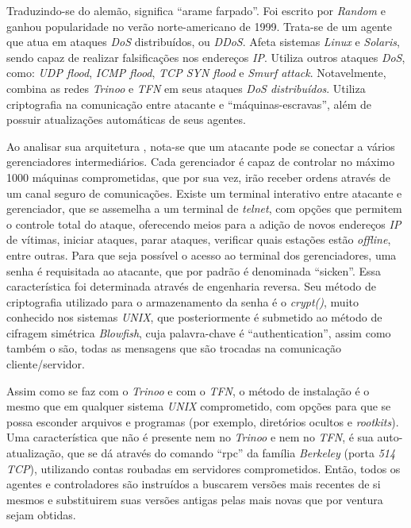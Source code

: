 Traduzindo-se do alemão, significa ``arame farpado''. Foi escrito por \textit{Random} e ganhou popularidade no verão norte-americano de 1999. Trata-se de um agente que atua em ataques \textit{DoS} distribuídos, ou \textit{DDoS}. Afeta sistemas \textit{Linux} e \textit{Solaris}, sendo capaz de realizar falsificações nos endereços \textit{IP}. Utiliza outros ataques \textit{DoS}, como: \textit{UDP flood}, \textit{ICMP flood}, \textit{TCP SYN flood} e \textit{Smurf attack}. Notavelmente, combina as redes \textit{Trinoo} e \textit{TFN} em seus ataques \textit{DoS distribuídos}. Utiliza criptografia na comunicação entre atacante e ``máquinas-escravas'', além de possuir atualizações automáticas de seus agentes.

Ao analisar sua arquitetura \cite{Stacheldraht}, nota-se que um atacante pode se conectar a vários gerenciadores intermediários. Cada gerenciador é capaz de controlar no máximo 1000 máquinas comprometidas, que por sua vez, irão receber ordens através de um canal seguro de comunicações. Existe um terminal interativo entre atacante e gerenciador, que se assemelha a um terminal de \textit{telnet}, com opções que permitem o controle total do ataque, oferecendo meios para a adição de novos endereços \textit{IP} de vítimas, iniciar ataques, parar ataques, verificar quais estações estão \textit{offline}, entre outras. Para que seja possível o acesso ao terminal dos gerenciadores, uma senha é requisitada ao atacante, que por padrão é denominada ``sicken''. Essa característica foi determinada através de engenharia reversa. Seu método de criptografia utilizado para o armazenamento da senha é o \textit{crypt()}, muito conhecido nos sistemas \textit{UNIX}, que posteriormente é submetido ao método de cifragem simétrica \textit{Blowfish}, cuja palavra-chave é ``authentication'', assim como também o são, todas as mensagens que são trocadas na comunicação cliente/servidor.

Assim como se faz com o \textit{Trinoo} e com o \textit{TFN}, o método de instalação é o mesmo que em qualquer sistema \textit{UNIX} comprometido, com opções para que se possa esconder arquivos e programas (por exemplo, diretórios ocultos e \textit{rootkits}). Uma característica que não é presente nem no \textit{Trinoo} e nem no \textit{TFN}, é sua auto-atualização, que se dá através do comando ``rpc'' da família \textit{Berkeley} (porta \textit{514 TCP}), utilizando contas roubadas em servidores comprometidos. Então, todos os agentes e controladores são instruídos a buscarem versões mais recentes de si mesmos e substituirem suas versões antigas pelas mais novas que por ventura sejam obtidas.

